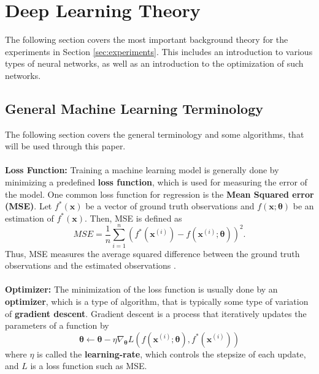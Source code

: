 \documentclass[./main.tex]{subfiles}
\begin{document}
\section{Deep Learning Theory}
The following section covers the most important background theory for the experiments in Section \ref{sec:experiments}. This includes an introduction to various types of neural networks, as well as an introduction to the optimization of such networks.

\subsection{General Machine Learning Terminology}
The following section covers the general terminology and some algorithms, that will be used through this paper. 
\\
\\
\noindent \textbf{Loss Function:} Training a machine learning model is generally done by minimizing a predefined \textbf{loss function}, which is used for measuring the error of the model. One common loss function for regression is the \textbf{Mean Squared error (MSE)}. Let $f^*(\bm{x})$ be a vector of ground truth observations and $f(\bm{x}; \bm{\theta})$ be an estimation of $f^*(\bm{x})$. Then, MSE is defined as
\begin{equation}
    MSE = \frac{1}{n} \sum_{i = 1} ^n \left( f^*\left(\bm{x}^{(i)}\right) - f\left(\bm{x}^{(i)}; \bm{\theta}\right)\right)^2.
\end{equation}
Thus, MSE measures the average squared difference between the ground truth observations and the estimated observations \cite{ISL}.
\\
\\
\noindent \textbf{Optimizer:} The minimization of the loss function is usually done by an \textbf{optimizer}, which is a type of algorithm, that is typically some type of variation of \textbf{gradient descent}. Gradient descent is a process that iteratively updates the parameters of a function by
\begin{equation}
    \bm{\theta} \leftarrow \bm{\theta} - \eta \nabla_{\bm{\theta}} L\left( f\left(\bm{x}^{(i)}; \bm{\theta}\right), f^*\left(\bm{x}^{(i)}\right) \right)
\end{equation}
where $\eta$ is called the \textbf{learning-rate}, which controls the stepsize of each update, and $L$ is a loss function such as MSE.
\\
\\
\end{document}
